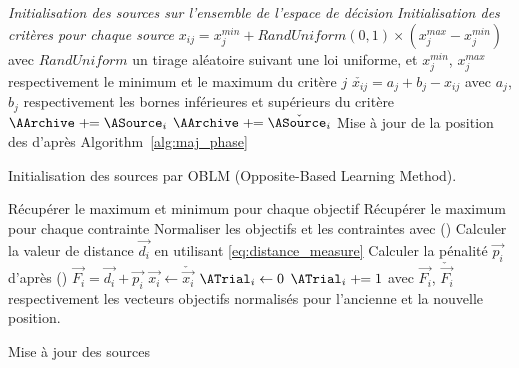 \begin{algorithm}\label{alg:init_phase}
  \SetAlgoVlined
  \emph{Initialisation des sources sur l’ensemble de l’espace de décision}\;
  {
    \emph{Initialisation des critères pour chaque source}\;
    {
      $x_{ij} = x_{j}^{min} + RandUniform(0, 1) \times (x_{j}^{max} - x_{j}^{min})$\;
      avec $RandUniform$ un tirage aléatoire suivant une loi uniforme, et $x_{j}^{min}$, $x_{j}^{max}$
      respectivement le minimum et le maximum du critère $j$\;
      \vspace{1em}  %
      $ \check{x_{ij}} = a_{j} + b_{j} - x_{ij}$\;
      avec $a_{j}$, $b_{j}$ respectivement les bornes inférieures et supérieurs du critère
    }
    {
      $\AArchive \pluseq \ASource_{i}$\;
    }
    {
      $\AArchive \pluseq \check{\ASource_{i}}$\;
    }
  }
  Mise à jour de la position des \ASources d’après Algorithm~\ref{alg:maj_phase}\;
  \caption{Initialisation des sources par OBLM (Opposite-Based Learning Method).}
\end{algorithm}

\begin{algorithm}\label{alg:maj_phase}
  \SetAlgoVlined
  Récupérer le maximum et minimum pour chaque objectif\;
  Récupérer le maximum pour chaque contrainte\;
  {
    Normaliser les objectifs et les contraintes avec ()\;
    Calculer la valeur de distance $\vec{d_{i}}$ en utilisant \eqref{eq:distance_measure}\;
    Calculer la pénalité $\vec{p_{i}}$ d’après ()\;
    $\vec{F_{i}} = \vec{d_{i}} + \vec{p_{i}}$\;
    {
      $\vec{x_{i}} \leftarrow \check{\vec{x_{i}}}$\;
      $\ATrial_{i} \leftarrow 0$\;
    }
    \Else
    {
      $\ATrial_{i} \pluseq 1$\;
    }
    avec $\vec{F_{i}}$, $\check{\vec{F_{i}}}$ respectivement les vecteurs objectifs
    normalisés pour l’ancienne et la nouvelle position.\;
  }
  \caption{Mise à jour des sources}
\end{algorithm}

